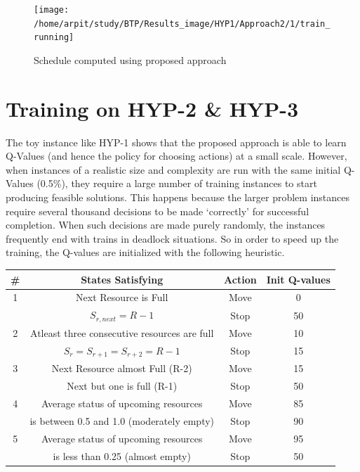 \begin{figure}[H]
    \centering
    \texttt{[image: /home/arpit/study/BTP/Results\_image/HYP1/Approach2/1/train\_running]}
    \caption{ Schedule computed using proposed approach }
    \label{image-myimage20}
\end{figure}

\section{Training on HYP-2 \& HYP-3}
The toy instance like HYP-1 shows that the proposed
approach is able to learn Q-Values (and hence the policy for
choosing actions) at a small scale. However, when instances
of a realistic size and complexity are run with the same
initial Q-Values (0.5\%), they require a large number of training
instances to start producing feasible solutions. This happens
because the larger problem instances require several thousand
decisions to be made ‘correctly’ for successful completion.
When such decisions are made purely randomly, the instances
frequently end with trains in deadlock situations. 
So in order to speed up the training, the Q-values are initialized with the following 
heuristic.

\begin{center}
    \begin{tabular}{ |c|c|c|c| } 
     \hline
     \# & States Satisfying & Action & Init Q-values \\ 
     \hline
    1 & Next Resource is Full & Move & 0 \\
     & $ S_{r,next} = R-1 $ & Stop & 50\\
    
     2 & Atleast three consecutive resources are full & Move & 10 \\
     & $ S_r = S_{r+1} = S_{r+2} = R-1 $   & Stop & 15\\
    
     3 & Next Resource almost Full (R-2) & Move & 15 \\
     & Next but one is full (R-1) & Stop & 50 \\
    
     4 & Average status of upcoming resources & Move & 85 \\
     & is between 0.5 and 1.0 (moderately empty) & Stop & 90\\
     
     5 & Average status of upcoming resources & Move & 95 \\
      & is less than 0.25 (almost empty)  & Stop & 50\\
     \hline

    \end{tabular}
\end{center}

